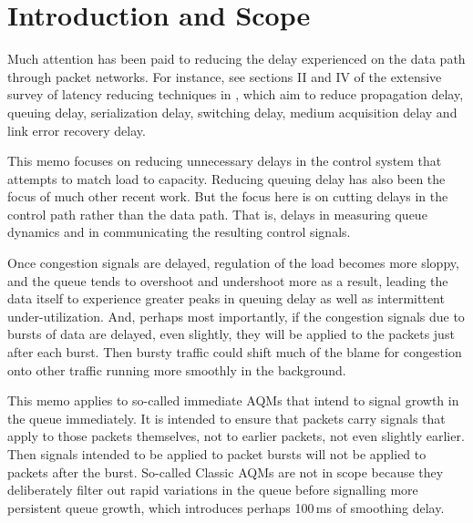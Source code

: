 \section{Introduction and Scope}\label{sigqdyntr_intro}

Much attention has been paid to reducing the delay experienced on the data path through packet networks. For instance, see sections II and IV of the extensive survey of latency reducing techniques in \cite{Briscoe14b:latency_survey}, which aim to reduce propagation delay, queuing delay, serialization delay, switching delay, medium acquisition delay and link error recovery delay.
%

This memo focuses on reducing unnecessary delays in the control system that attempts to match load to capacity. Reducing queuing delay has also been the focus of much other recent work. But the focus here is on cutting delays in the control path rather than the data path. That is, delays in measuring queue dynamics and in communicating the resulting control signals.

Once congestion signals are delayed, regulation of the load becomes more sloppy, and the queue tends to overshoot and undershoot more as a result, leading the data itself to experience greater peaks in queuing delay as well as intermittent under-utilization. And, perhaps most importantly, if the congestion signals due to bursts of data are delayed, even slightly, they will be applied to the packets just after each burst. Then bursty traffic could shift much of the blame for congestion onto other traffic running more smoothly in the background.

This memo applies to so-called immediate AQMs that intend to signal growth in the queue immediately. It is intended to ensure that packets carry signals that apply to those packets themselves, not to earlier packets, not even slightly earlier. Then signals intended to be applied to packet bursts will not be applied to packets after the burst. So-called Classic AQMs are not in scope because they deliberately filter out rapid variations in the queue before signalling more persistent queue growth, which introduces perhaps 100\,ms of smoothing delay.


